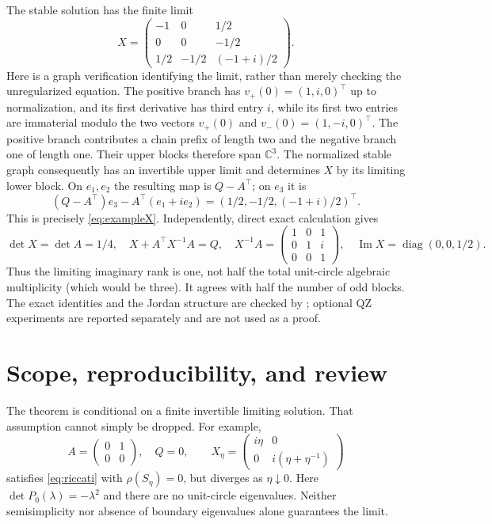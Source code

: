 \documentclass[11pt]{article}
\newcommand{\C}{\mathbb C}
\newcommand{\Ima}{\operatorname{Im}}
\newcommand{\diag}{\operatorname{diag}}
\begin{document}
The stable solution has the finite limit
\begin{equation}\label{eq:exampleX}
X=\begin{pmatrix}-1&0&1/2\\0&0&-1/2\\1/2&-1/2&(-1+i)/2\end{pmatrix}.
\end{equation}
Here is a graph verification identifying the limit, rather than merely checking the
unregularized equation. The positive branch has $v_+(0)=(1,i,0)^\top$ up to normalization,
and its first derivative has third entry $i$, while its first two entries are immaterial
modulo the two vectors $v_+(0)$ and $v_-(0)=(1,-i,0)^\top$.
The positive branch contributes a chain prefix of length two and the negative branch
one of length one. Their upper blocks therefore span $\C^3$.
The normalized stable graph consequently has an invertible upper limit and determines
$X$ by its limiting lower block. On $e_1,e_2$ the resulting map is $Q-A^\top$; on $e_3$ it is
\[
(Q-A^\top)e_3-A^\top(e_1+i e_2)
=(1/2,-1/2,(-1+i)/2)^\top.
\]
This is precisely \eqref{eq:exampleX}.
Independently, direct exact calculation gives
\[
\det X=\det A=1/4,\quad
X+A^\top X^{-1}A=Q,\quad
X^{-1}A=\begin{pmatrix}1&0&1\\0&1&i\\0&0&1\end{pmatrix},\quad
\Ima X=\diag(0,0,1/2).
\]
Thus the limiting imaginary rank is one, not half the total unit-circle algebraic
multiplicity (which would be three). It agrees with half the number of odd blocks.
The exact identities and the Jordan structure are checked by
; optional QZ experiments are reported separately
and are not used as a proof.

\section{Scope, reproducibility, and review}
The theorem is conditional on a finite invertible limiting solution. That assumption
cannot simply be dropped. For example,
\[
A=\begin{pmatrix}0&1\\0&0\end{pmatrix},\quad Q=0,\qquad
X_\eta=\begin{pmatrix}i\eta&0\\0&i(\eta+\eta^{-1})\end{pmatrix}
\]
satisfies \eqref{eq:riccati} with $\rho(S_\eta)=0$, but diverges as $\eta\downarrow0$.
Here $\det P_0(\lambda)=-\lambda^2$ and there are no unit-circle eigenvalues.
Neither semisimplicity nor absence of boundary eigenvalues alone guarantees the limit.
\end{document}
